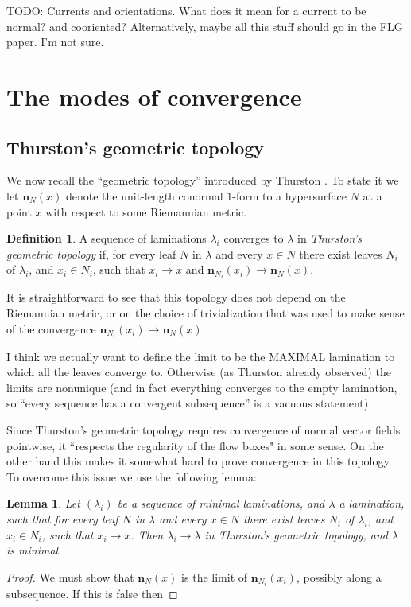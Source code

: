 \documentclass[reqno,10pt]{amsart}
\newcommand{\normal}{\mathbf n}
\newcommand{\dfn}[1]{\emph{#1}\index{#1}}
\newtheorem{lemma}[theorem]{Lemma}
\theoremstyle{definition}
\newtheorem{definition}[theorem]{Definition}
\numberwithin{equation}{section}
\begin{document}
TODO: Currents and orientations. What does it mean for a current to be normal? and cooriented?
Alternatively, maybe all this stuff should go in the FLG paper. I'm not sure.



\section{The modes of convergence}



\subsection{Thurston's geometric topology}
We now recall the ``geometric topology'' introduced by Thurston \cite[\S8.10]{thurston1998minimal}.
To state it we let $\normal_N(x)$ denote the unit-length conormal $1$-form to a hypersurface $N$ at a point $x$ with respect to some Riemannian metric.

\begin{definition}
A sequence of laminations $\lambda_i$ converges to $\lambda$ in \dfn{Thurston's geometric topology} if, for every leaf $N$ in $\lambda$ and every $x \in N$ there exist leaves $N_i$ of $\lambda_i$, and $x_i \in N_i$, such that $x_i \to x$ and $\normal_{N_i}(x_i) \to \normal_N(x)$.
\end{definition}

It is straightforward to see that this topology does not depend on the Riemannian metric, or on the choice of trivialization that was used to make sense of the convergence $\normal_{N_i}(x_i) \to \normal_N(x)$.

I think we actually want to define the limit to be the MAXIMAL lamination to which all the leaves converge to.
Otherwise (as Thurston already observed) the limits are nonunique (and in fact everything converges to the empty lamination, so ``every sequence has a convergent subsequence'' is a vacuous statement).

Since Thurston's geometric topology requires convergence of normal vector fields pointwise, it ``respects the regularity of the flow boxes" in some sense.
On the other hand this makes it somewhat hard to prove convergence in this topology.
To overcome this issue we use the following lemma:

\begin{lemma}
Let $(\lambda_i)$ be a sequence of minimal laminations, and $\lambda$ a lamination, such that for every leaf $N$ in $\lambda$ and every $x \in N$ there exist leaves $N_i$ of $\lambda_i$, and $x_i \in N_i$, such that $x_i \to x$.
Then $\lambda_i \to \lambda$ in Thurston's geometric topology, and $\lambda$ is minimal.
\end{lemma}
\begin{proof}
We must show that $\normal_N(x)$ is the limit of $\normal_{N_i}(x_i)$, possibly along a subsequence.
If this is false then
\end{proof}
\end{document}
